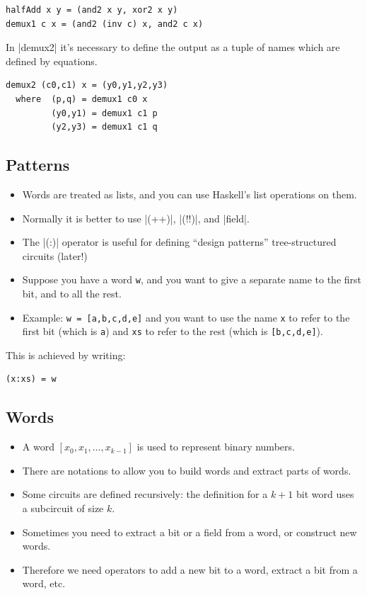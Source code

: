 \documentclass[]{svmono}
\begin{document}
\begin{verbatim}
halfAdd x y = (and2 x y, xor2 x y)
demux1 c x = (and2 (inv c) x, and2 c x)
\end{verbatim}

In |demux2| it's necessary to define the output as a tuple of
names which are defined by equations.

\begin{verbatim}
demux2 (c0,c1) x = (y0,y1,y2,y3)
  where  (p,q) = demux1 c0 x
         (y0,y1) = demux1 c1 p
         (y2,y3) = demux1 c1 q
\end{verbatim}
\subsection*{Patterns}
\label{sec:orgd9be296}

\begin{itemize}
\item Words are treated as lists, and you can use Haskell's list
operations on them.
\item Normally it is better to use |(++)|, |(!!)|, and |field|.
\item The |(:)| operator is useful for defining ``design patterns''
tree-structured circuits (later!)
\item Suppose you have a word \texttt{w}, and you want to give a
separate name to the first bit, and to all the rest.
\item Example: \texttt{w = [a,b,c,d,e]} and you want to use the
name \texttt{x} to refer to the first bit (which is \texttt{a})
and \texttt{xs} to refer to the rest (which is
\texttt{[b,c,d,e]}).
\end{itemize}

This is achieved by writing:

\begin{verbatim}
(x:xs) = w
\end{verbatim}
\subsection*{Words}
\label{sec:orgc0138bf}

\begin{itemize}
\item A word \([x_0, x_1, \ldots, x_{k-1}]\) is used to represent binary
numbers.

\item There are notations to allow you to build words and extract
parts of words.

\item Some circuits are defined recursively: the definition for a
\(k+1\) bit word uses a subcircuit of size \(k\).

\item Sometimes you need to extract a bit or a field from a word, or
construct new words.

\item Therefore we need operators to add a new bit to a word, extract
a bit from a word, etc.
\end{itemize}
\end{document}
